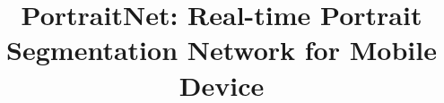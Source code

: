 \title{PortraitNet: Real-time Portrait Segmentation Network for Mobile Device}

\author{
}



\maketitle